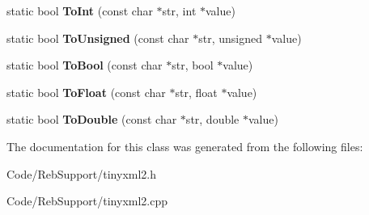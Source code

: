 \begin{DoxyCompactItemize}
\item 
static bool {\bfseries To\+Int} (const char $\ast$str, int $\ast$value)\hypertarget{classtinyxml2_1_1_x_m_l_util_ad4df4023d11ee3fca9689c49b9707323}{}\label{classtinyxml2_1_1_x_m_l_util_ad4df4023d11ee3fca9689c49b9707323}

\item 
static bool {\bfseries To\+Unsigned} (const char $\ast$str, unsigned $\ast$value)\hypertarget{classtinyxml2_1_1_x_m_l_util_a210c8637d5eb4ce3d4625294af0efc2f}{}\label{classtinyxml2_1_1_x_m_l_util_a210c8637d5eb4ce3d4625294af0efc2f}

\item 
static bool {\bfseries To\+Bool} (const char $\ast$str, bool $\ast$value)\hypertarget{classtinyxml2_1_1_x_m_l_util_ae5b03e0a1ca5d42052a7ac540f7aa12a}{}\label{classtinyxml2_1_1_x_m_l_util_ae5b03e0a1ca5d42052a7ac540f7aa12a}

\item 
static bool {\bfseries To\+Float} (const char $\ast$str, float $\ast$value)\hypertarget{classtinyxml2_1_1_x_m_l_util_a399e71edb5f29d61ea81d91ee0332bb9}{}\label{classtinyxml2_1_1_x_m_l_util_a399e71edb5f29d61ea81d91ee0332bb9}

\item 
static bool {\bfseries To\+Double} (const char $\ast$str, double $\ast$value)\hypertarget{classtinyxml2_1_1_x_m_l_util_ad8f75ac140fb19c1c6e164a957c4cd53}{}\label{classtinyxml2_1_1_x_m_l_util_ad8f75ac140fb19c1c6e164a957c4cd53}

\end{DoxyCompactItemize}


The documentation for this class was generated from the following files\+:\begin{DoxyCompactItemize}
\item 
Code/\+Reb\+Support/tinyxml2.\+h\item 
Code/\+Reb\+Support/tinyxml2.\+cpp\end{DoxyCompactItemize}
